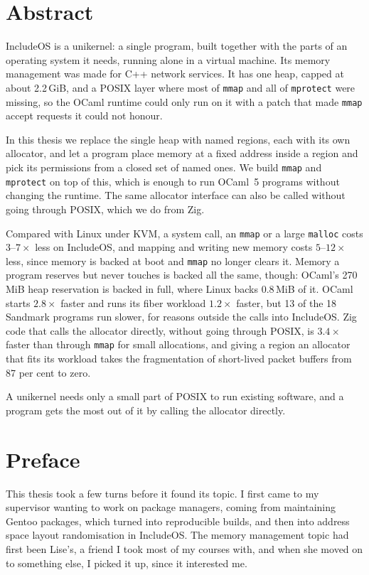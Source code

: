 \documentclass[12pt]{report}
\renewcommand{\_}{\origunderscore\allowbreak}
\begin{document}
\chapter*{Abstract}
\thispagestyle{empty}

IncludeOS is a unikernel: a single program, built together with the parts of an operating system it needs, running alone in a virtual machine. Its memory management was made for C++ network services. It has one heap, capped at about 2.2\,GiB, and a POSIX layer where most of \texttt{mmap} and all of \texttt{mprotect} were missing, so the OCaml runtime could only run on it with a patch that made \texttt{mmap} accept requests it could not honour.

In this thesis we replace the single heap with named regions, each with its own allocator, and let a program place memory at a fixed address inside a region and pick its permissions from a closed set of named ones. We build \texttt{mmap} and \texttt{mprotect} on top of this, which is enough to run OCaml~5 programs without changing the runtime. The same allocator interface can also be called without going through POSIX, which we do from Zig.

Compared with Linux under KVM, a system call, an \texttt{mmap} or a large \texttt{malloc} costs $3$--$7\times$ less on IncludeOS, and mapping and writing new memory costs $5$--$12\times$ less, since memory is backed at boot and \texttt{mmap} no longer clears it. Memory a program reserves but never touches is backed all the same, though: OCaml's 270\,MiB heap reservation is backed in full, where Linux backs 0.8\,MiB of it. OCaml starts $2.8\times$ faster and runs its fiber workload $1.2\times$ faster, but 13 of the 18 Sandmark programs run slower, for reasons outside the calls into IncludeOS. Zig code that calls the allocator directly, without going through POSIX, is $3.4\times$ faster than through \texttt{mmap} for small allocations, and giving a region an allocator that fits its workload takes the fragmentation of short-lived packet buffers from 87 per cent to zero.

A unikernel needs only a small part of POSIX to run existing software, and a program gets the most out of it by calling the allocator directly.

\chapter*{Preface}
\thispagestyle{empty}

This thesis took a few turns before it found its topic. I first came to my supervisor wanting to work on package managers, coming from maintaining Gentoo packages, which turned into reproducible builds, and then into address space layout randomisation in IncludeOS. The memory management topic had first been Lise's, a friend I took most of my courses with, and when she moved on to something else, I picked it up, since it interested me.
\end{document}

